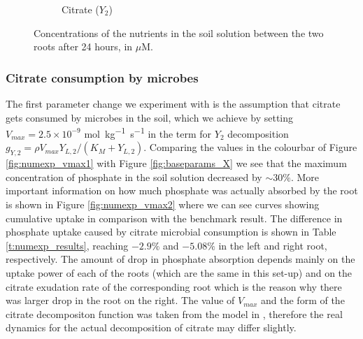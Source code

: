 \documentclass[11pt]{article}
\numberwithin{equation}{section}
\begin{document}
\begin{figure}[!htb]
\begin{subfigure}[t]{0.32\textwidth}
    \caption{Citrate ($Y_2$)}
    \label{fig:baseparams_Y2}
\end{subfigure}
\caption{Concentrations of the nutrients in the soil solution between the two roots after 24 hours, in $\mu$M.}
\label{fig:baseparams}
\end{figure}

\subsubsection{Citrate consumption by microbes}
\label{sec:numexp_vmax}
The first parameter change we experiment with is the assumption that citrate gets consumed by microbes in the soil, which we achieve by setting $V_{max} = 2.5 \times 10^{-9}$ \si{mol.kg^{-1}.s^{-1}} in the term for $Y_2$ decomposition $g_{Y,2} = \rho V_{max} Y_{L,2}/(K_M+Y_{L,2})$. Comparing the values in the colourbar of Figure \ref{fig:numexp_vmax1} with Figure \ref{fig:baseparams_X} we see that the maximum concentration of phosphate in the soil solution decreased by $\sim 30\%$. More important information on how much phosphate was actually absorbed by the root is shown in Figure \ref{fig:numexp_vmax2} where we can see curves showing cumulative uptake in comparison with the benchmark result. The difference in phosphate uptake caused by citrate microbial consumption is shown in Table \ref{t:numexp_results}, reaching $-2.9\%$ and $-5.08\%$ in the left and right root, respectively. The amount of drop in phosphate absorption depends mainly on the uptake power of each of the roots (which are the same in this set-up) and on the citrate exudation rate of the corresponding root which is the reason why there was larger drop in the root on the right. The value of $V_{max}$ and the form of the citrate decompositon function was taken from the  model in \cite{Ptashnyk-2011}, therefore the real dynamics for the actual decomposition of citrate may differ slightly.
\end{document}
